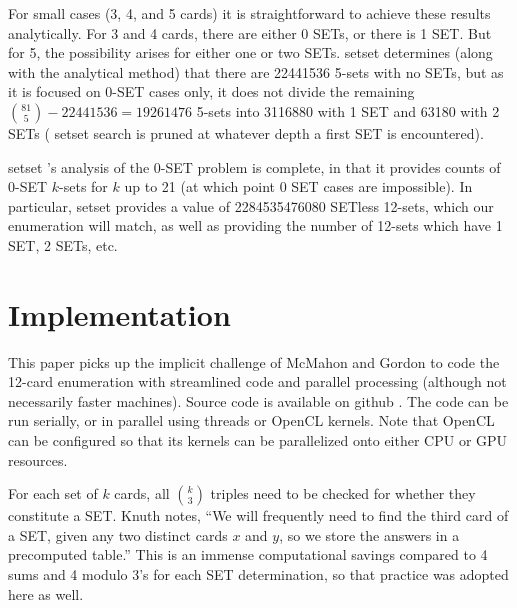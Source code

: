 \documentclass[10pt]{amsart}
\newcommand{\SETSET}{  {\sc setset} }
\begin{document}
For small cases (3, 4, and 5 cards) it is straightforward to achieve these
results analytically. For 3 and 4 cards, there are either 0 SETs, or there is 1
SET. But for 5, the possibility arises for either one or two SETs. \SETSET
determines (along with the analytical method) that there are 22441536 5-sets
with no SETs, but as it is focused on 0-SET cases only, it does not divide the
remaining $\binom{81}{5}-22441536=19261476$ 5-sets into 3116880 with 1 SET and
63180 with 2 SETs (\SETSET search is pruned at whatever depth a first SET is
encountered).

\SETSET's analysis of the 0-SET problem is complete, in that it provides counts
of 0-SET $k$-sets for $k$ up to 21 (at which point 0 SET cases are impossible).
In particular, \SETSET provides a value of 2284535476080 SETless 12-sets, which
our enumeration will match, as well as providing the number of 12-sets which
have 1 SET, 2 SETs, etc.


\section{Implementation}
This paper picks up the implicit challenge of McMahon and Gordon to code the
12-card enumeration with streamlined code and parallel processing (although not
necessarily faster machines). Source code is available on github \cite{ME}. The
code can be run serially, or in parallel using threads or OpenCL \cite{OPENCL}
kernels. Note that OpenCL can be configured so that its kernels can be
parallelized onto either CPU or GPU resources.

For each set of $k$ cards, all $\binom{k}{3}$ triples need to be checked for
whether they constitute a SET. Knuth notes, ``We will frequently need to find
the third card of a SET, given any two distinct cards $x$ and $y$, so we store
the answers in a precomputed table.''  This is an immense computational savings
compared to 4 sums and 4 modulo 3's for each SET determination, so that practice
was adopted here as well.
\end{document}
